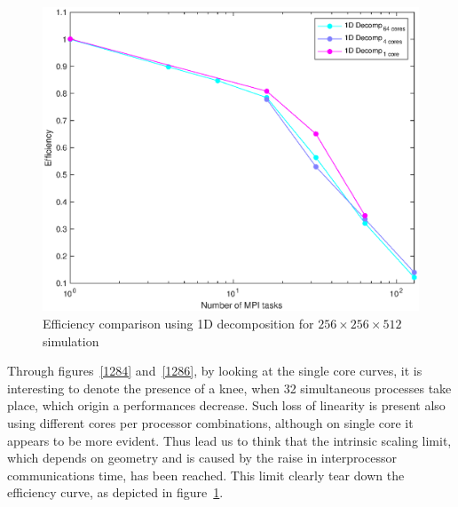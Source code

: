 \begin{figure}
\begin{center}
\includegraphics[scale=0.55]{grafici/1288}
\caption{Efficiency comparison using 1D decomposition for $256\times 256\times 512$  simulation}
\label{1288}
\end{center}
\end{figure}
Through figures~\ref{1284} and~\ref{1286}, by looking at the single core curves, it is interesting to denote the presence of a knee, when 32 simultaneous processes take place, which origin a performances decrease. Such loss of linearity is present also using different cores per processor combinations, although on single core it appears to be more evident. Thus lead us to think that the intrinsic scaling limit, which depends on geometry and is caused by the raise in interprocessor communications time, has been reached. This limit clearly tear down the efficiency curve, as depicted in figure~\ref{1288}.\\

